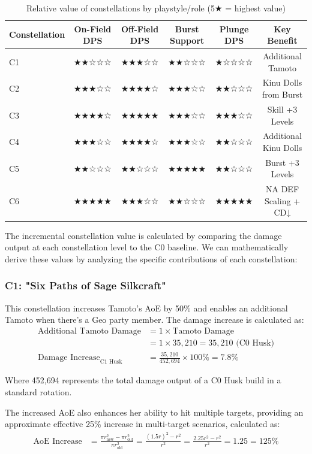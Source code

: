 \documentclass[12pt,a4paper]{article}
\begin{document}
\begin{table}[h]
\centering
\begin{tabular}{lccccc}
\toprule
\textbf{Constellation} & \textbf{On-Field DPS} & \textbf{Off-Field DPS} & \textbf{Burst Support} & \textbf{Plunge DPS} & \textbf{Key Benefit} \\
\midrule
C1 & ★★☆☆☆ & ★★★☆☆ & ★★☆☆☆ & ★☆☆☆☆ & Additional Tamoto \\
C2 & ★★★☆☆ & ★★★★☆ & ★★★☆☆ & ★★☆☆☆ & Kinu Dolls from Burst \\
C3 & ★★★★☆ & ★★★★★ & ★★★☆☆ & ★★★☆☆ & Skill +3 Levels \\
C4 & ★★★☆☆ & ★★★★☆ & ★★★☆☆ & ★★☆☆☆ & Additional Kinu Dolls \\
C5 & ★★☆☆☆ & ★★☆☆☆ & ★★★★★ & ★★☆☆☆ & Burst +3 Levels \\
C6 & ★★★★★ & ★★★☆☆ & ★★☆☆☆ & ★★★★★ & NA DEF Scaling + CD↓ \\
\bottomrule
\end{tabular}
\caption{Relative value of constellations by playstyle/role (5★ = highest value)}
\label{tab:constellation_value_by_role}
\end{table}

The incremental constellation value is calculated by comparing the damage output at each constellation level to the C0 baseline. We can mathematically derive these values by analyzing the specific contributions of each constellation:

\subsubsection{C1: "Six Paths of Sage Silkcraft"}
This constellation increases Tamoto's AoE by 50\% and enables an additional Tamoto when there's a Geo party member. The damage increase is calculated as:
\begin{align}
\text{Additional Tamoto Damage} &= 1 \times \text{Tamoto Damage} \\
&= 1 \times 35,210 = 35,210 \text{ (C0 Husk)} \\
\text{Damage Increase}_{\text{C1 Husk}} &= \frac{35,210}{452,694} \times 100\% = 7.8\%
\end{align}

Where 452,694 represents the total damage output of a C0 Husk build in a standard rotation.

The increased AoE also enhances her ability to hit multiple targets, providing an approximate effective 25\% increase in multi-target scenarios, calculated as:
\begin{align}
\text{AoE Increase} &= \frac{\pi r_{\text{new}}^2 - \pi r_{\text{old}}^2}{\pi r_{\text{old}}^2} = \frac{(1.5r)^2 - r^2}{r^2} = \frac{2.25r^2 - r^2}{r^2} = 1.25 = 125\%
\end{align}
\end{document}
